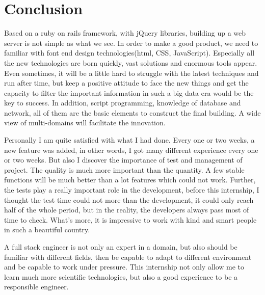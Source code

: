 \section{Conclusion}
Based on a ruby on rails framework, with jQuery libraries, building up a web server is not simple as what we see. In order to make a good product, we need to familiar with font end design technologies(html, CSS, JavaScript). Especially all the new technologies are born quickly, vast solutions and enormous tools appear. Even sometimes, it will be a little hard to struggle with the latest techniques and run after time, but keep a positive attitude to face the new things and get the capacity to filter the important information in such a big data era would be the key to success. In addition, script programming, knowledge of database and network, all of them are the basic elements to construct the final building. A wide view of multi-domains will facilitate the innovation.

Personally I am quite satisfied with what I had done. Every one or two weeks, a new feature was added, in other words, I got many different experience every one or two weeks. But also I discover the importance of test and management of project. The quality is much more important than the quantity. A few stable functions will be much better than a lot features which could not work. Further, the tests play a really important role in the development, before this internship, I thought the test time could not more than the development, it could only reach half of the whole period, but in the reality, the developers always pass most of time to check. What's more, it is impressive to work with kind and smart people in such a beautiful country. 

A full stack engineer is not only an expert in a domain, but also should be familiar with different fields, then be capable to adapt to different environment and be capable to work under pressure. This internship not only allow me to learn much more scientific technologies, but also a good experience to be a responsible engineer.